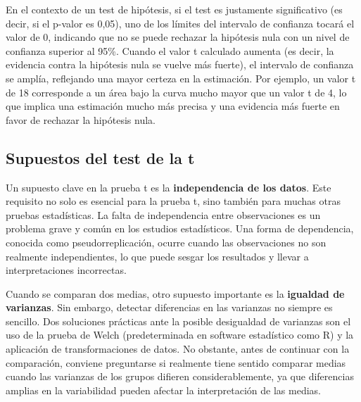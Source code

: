 \documentclass{config/apuntes}\usepackage[]{graphicx}\usepackage[]{xcolor}
\begin{document}
En el contexto de un test de hipótesis, si el test es justamente significativo (es decir, si el p-valor es 0,05), uno de los límites del intervalo de confianza tocará el valor de 0, indicando que no se puede rechazar la hipótesis nula con un nivel de confianza superior al 95\%. Cuando el valor t calculado aumenta (es decir, la evidencia contra la hipótesis nula se vuelve más fuerte), el intervalo de confianza se amplía, reflejando una mayor certeza en la estimación. Por ejemplo, un valor t de 18 corresponde a un área bajo la curva mucho mayor que un valor t de 4, lo que implica una estimación mucho más precisa y una evidencia más fuerte en favor de rechazar la hipótesis nula.

\subsection{Supuestos del test de la t}
Un supuesto clave en la prueba t es la \textbf{independencia de los datos}. Este requisito no solo es esencial para la prueba t, sino también para muchas otras pruebas estadísticas. La falta de independencia entre observaciones es un problema grave y común en los estudios estadísticos. Una forma de dependencia, conocida como pseudorreplicación, ocurre cuando las observaciones no son realmente independientes, lo que puede sesgar los resultados y llevar a interpretaciones incorrectas.

Cuando se comparan dos medias, otro supuesto importante es la \textbf{igualdad de varianzas}. Sin embargo, detectar diferencias en las varianzas no siempre es sencillo. Dos soluciones prácticas ante la posible desigualdad de varianzas son el uso de la prueba de Welch (predeterminada en software estadístico como R) y la aplicación de transformaciones de datos. No obstante, antes de continuar con la comparación, conviene preguntarse si realmente tiene sentido comparar medias cuando las varianzas de los grupos difieren considerablemente, ya que diferencias amplias en la variabilidad pueden afectar la interpretación de las medias.
\end{document}
